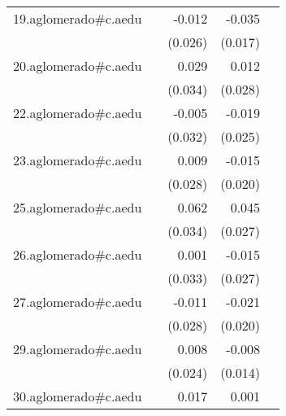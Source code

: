 {\begin{longtable}{l*{4}{D{.}{.}{-1}}}
\addlinespace
19.aglomerado#c.aedu&                     &      -0.012         &      -0.035\sym{*}  &                     \\
            &                     &     (0.026)         &     (0.017)         &                     \\
\addlinespace
20.aglomerado#c.aedu&                     &       0.029         &       0.012         &                     \\
            &                     &     (0.034)         &     (0.028)         &                     \\
\addlinespace
22.aglomerado#c.aedu&                     &      -0.005         &      -0.019         &                     \\
            &                     &     (0.032)         &     (0.025)         &                     \\
\addlinespace
23.aglomerado#c.aedu&                     &       0.009         &      -0.015         &                     \\
            &                     &     (0.028)         &     (0.020)         &                     \\
\addlinespace
25.aglomerado#c.aedu&                     &       0.062         &       0.045         &                     \\
            &                     &     (0.034)         &     (0.027)         &                     \\
\addlinespace
26.aglomerado#c.aedu&                     &       0.001         &      -0.015         &                     \\
            &                     &     (0.033)         &     (0.027)         &                     \\
\addlinespace
27.aglomerado#c.aedu&                     &      -0.011         &      -0.021         &                     \\
            &                     &     (0.028)         &     (0.020)         &                     \\
\addlinespace
29.aglomerado#c.aedu&                     &       0.008         &      -0.008         &                     \\
            &                     &     (0.024)         &     (0.014)         &                     \\
\addlinespace
30.aglomerado#c.aedu&                     &       0.017         &       0.001         &                     \\

\end{longtable}}

